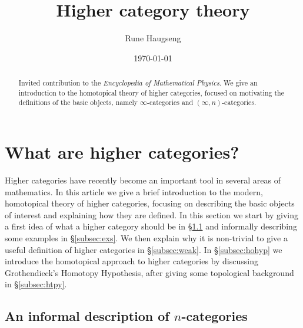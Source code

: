 \documentclass[a4paper,11pt]{article}
\title{Higher category theory}
\author{Rune Haugseng}
\date{\today}
\begin{document}
\maketitle
\begin{abstract}
  Invited contribution to the \emph{Encyclopedia of Mathematical
    Physics}. We give an introduction to the homotopical theory of
  higher categories, focused on motivating the definitions of the
  basic objects, namely $\infty$-categories and
  $(\infty,n)$-categories.
\end{abstract}

\tableofcontents


\section{What are higher categories?}
Higher categories have recently become an important tool in several
areas of mathematics. In this article we give a brief
introduction to the modern, homotopical theory of higher categories,
focusing on describing the basic objects of interest and explaining
how they are defined. In this section we start by giving a first idea
of what a higher category should be in \S\ref{subsec:ncats} and
informally describing some examples in \S\ref{subsec:exs}. We then
explain why it is non-trivial to give a useful definition of higher
categories in \S\ref{subsec:weak}.  In \S\ref{subsec:hohyp} we
introduce the homotopical approach to higher categories by discussing
Grothendieck's Homotopy Hypothesis, after giving some topological
background in \S\ref{subsec:htpy}.


\subsection{An informal description of $n$-categories}\label{subsec:ncats}
\end{document}

